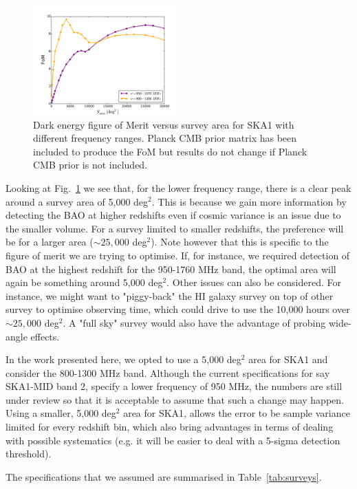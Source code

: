 \documentclass[useAMS,usenatbib]{mn2e}
\begin{document}
{%
\begin{figure}
\vspace{-1em}
\includegraphics[width=0.5\textwidth]{plots/area_vs_FoM_with_prior_2feq.pdf}
\caption{Dark energy figure of Merit versus survey area for SKA1  with different frequency ranges. Planck CMB prior matrix has been included to produce the FoM but results do not change if Planck CMB prior is not included.}\vspace{-2em}
\label{fig:area_vs_fom}
\end{figure}
Looking at Fig.~\ref{fig:area_vs_fom} we see that, for the lower frequency range, there is a clear peak around a survey area of 5,000 deg$^2$. This is because we gain more information by detecting the BAO at higher redshifts even if cosmic variance is an issue due to the smaller volume. For a survey limited to smaller redshifts, the preference will be for a larger area ($\sim 25,000$ deg$^2$). Note however that this is specific to the figure of merit we are trying to optimise. If, for instance, we required detection of BAO at the highest redshift for the 950-1760 MHz band, the optimal area will again be something around 5,000 deg$^2$. Other issues can also be considered. For instance, we might want to "piggy-back" the HI galaxy survey on top of other survey to optimise observing time, which could drive to use the 10,000 hours over $\sim 25,000$ deg$^2$. A "full sky" survey would also have the advantage of probing wide-angle effects.

In the work presented here, we opted to use a 5,000 deg$^2$ area for SKA1 and consider the 800-1300 MHz band. Although the current specifications for say SKA1-MID band 2, specify a lower frequency of 950 MHz, the numbers are still under review so that it is acceptable to assume that such a change may happen. Using a smaller, 5,000 deg$^2$ area for SKA1, allows the error to be sample variance limited for every redshift bin, which also bring advantages in terms of dealing with possible systematics (e.g. it will be easier to deal with a 5-sigma detection threshold). }The specifications that we assumed are summarised in Table~\ref{tab:surveys}. 
\end{document}
